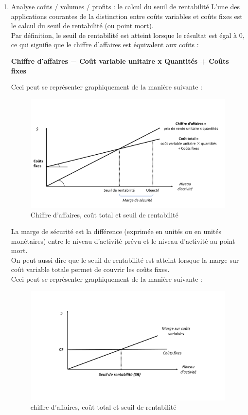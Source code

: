 \documentclass{tufte-handout}
\begin{document}
\begin{enumerate}
\item Analyse coûts / volumes / profits : le calcul du seuil de rentabilité
\label{sec:org4d316a3}
L'une des applications courantes de la distinction entre coûts variables et coûts fixes est le calcul du seuil de rentabilité (ou point mort).\\
Par définition, le seuil de rentabilité est atteint lorsque le résultat est égal à 0, ce qui signifie que le chiffre d'affaires est équivalent aux coûts :\\
\begin{center}
\textbf{Chiffre d'affaires = Coût variable unitaire x Quantités + Coûts fixes}\\
\end{center}
Ceci peut se représenter graphiquement de la manière suivante :\\
\begin{figure}[htbp]
\centering
\includegraphics[width=.9\linewidth]{./img/srcact.pdf}
\caption{Chiffre d'affaires, coût total et seuil de rentabilité}
\end{figure}
La marge de sécurité est la différence (exprimée en unités ou en unités monétaires) entre le niveau d'activité prévu et le niveau d'activité au point mort.\\

On peut aussi dire que le seuil de rentabilité est atteint lorsque la marge sur coût variable totale permet de couvrir les coûts fixes.\\
Ceci peut se représenter graphiquement de la manière suivante :\\
\begin{figure}[htbp]
\centering
\includegraphics[width=.9\linewidth]{./img/srmcvcf.pdf}
\caption{chiffre d'affaires, coût total et seuil de rentabilité}
\end{figure}


\end{enumerate}
\end{document}

